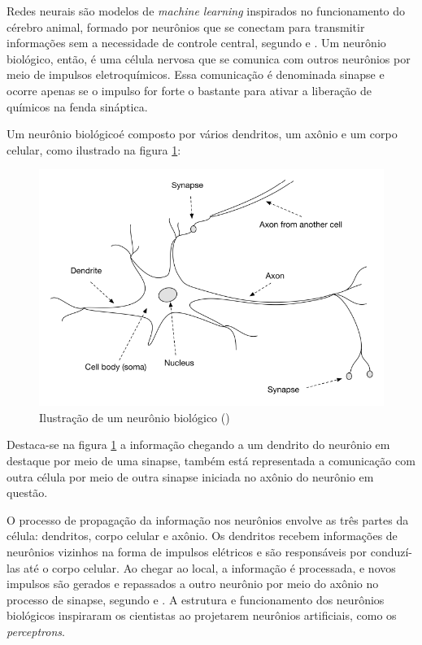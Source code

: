 Redes neurais são modelos de \textit{machine learning} inspirados no funcionamento
do cérebro animal, formado por neurônios que se
conectam para transmitir informações sem a necessidade de 
controle central, segundo \citet{deeplearningbook} e \citet{dl-oreilly}. Um neurônio biológico, então, 
é uma célula nervosa que se comunica com outros neurônios 
por meio de impulsos eletroquímicos. Essa comunicação é 
denominada sinapse e ocorre apenas se o impulso 
for forte o bastante para ativar a liberação de
químicos na fenda sináptica. 

Um neurônio biológicoé composto por vários dendritos, 
um axônio e um corpo celular, como ilustrado na figura \ref{fig:neuron}:

\begin{figure}[H] 
  \includegraphics[width= 12cm]{../figuras/neuron.png}
  \caption{Ilustração de um neurônio biológico (\citealt[][p.44]{dl-oreilly})}
  \label{fig:neuron}
\end{figure}

Destaca-se na figura \ref{fig:neuron} a informação chegando a um 
dendrito do neurônio em destaque
por meio de uma sinapse, também está representada a comunicação com outra célula
por meio de outra sinapse iniciada no axônio 
do neurônio em questão. 

O processo de propagação da informação nos neurônios 
envolve as três partes da célula: dendritos, corpo celular
e axônio.
Os dendritos recebem informações de neurônios vizinhos 
na forma de impulsos elétricos e são responsáveis 
por conduzí-las até o corpo celular. 
Ao chegar ao local, a informação é processada, e novos 
impulsos são gerados e repassados a outro neurônio 
por meio do axônio no processo de sinapse, segundo \citet{fund_deep_learning} e  \citet{deeplearningbook}.
A estrutura e funcionamento dos neurônios biológicos inspiraram
os cientistas ao projetarem neurônios artificiais, como 
os \textit{perceptrons}. 

